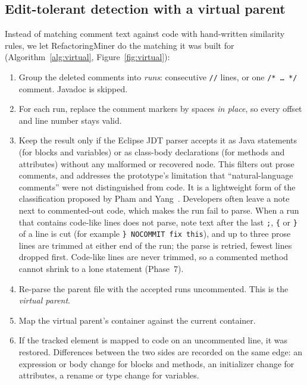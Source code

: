 \documentclass[11pt,a4paper]{article}
\newcommand{\code}[1]{\texttt{#1}}
\begin{document}
\subsection{Edit-tolerant detection with a virtual parent}\label{sec:virtual}
Instead of matching comment text against code with hand-written similarity rules, we let RefactoringMiner do the matching it was built for (Algorithm~\ref{alg:virtual}, Figure~\ref{fig:virtual}):
\begin{enumerate}
  \item Group the deleted comments into \emph{runs}: consecutive \code{//} lines, or one \code{/*\,\ldots\,*/} comment. Javadoc is skipped.
  \item For each run, replace the comment markers by spaces \emph{in place}, so every offset and line number stays valid.
  \item Keep the result only if the Eclipse JDT parser accepts it as Java statements (for blocks and variables) or as class-body declarations (for methods and attributes) without any malformed or recovered node. This filters out prose comments, and addresses the prototype's limitation that ``natural-language comments'' were not distinguished from code. It is a lightweight form of the classification proposed by Pham and Yang~\cite{pham2020}. Developers often leave a note next to commented-out code, which makes the run fail to parse. When a run that contains code-like lines does not parse, note text after the last \code{;}, \code{\{} or \code{\}} of a line is cut (for example \code{\} NOCOMMIT fix this}), and up to three prose lines are trimmed at either end of the run; the parse is retried, fewest lines dropped first. Code-like lines are never trimmed, so a commented method cannot shrink to a lone statement (Phase~7).
  \item Re-parse the parent file with the accepted runs uncommented. This is the \emph{virtual parent}.
  \item Map the virtual parent's container against the current container.
  \item If the tracked element is mapped to code on an uncommented line, it was restored. Differences between the two sides are recorded on the same edge: an expression or body change for blocks and methods, an initializer change for attributes, a rename or type change for variables.
\end{enumerate}
\end{document}
